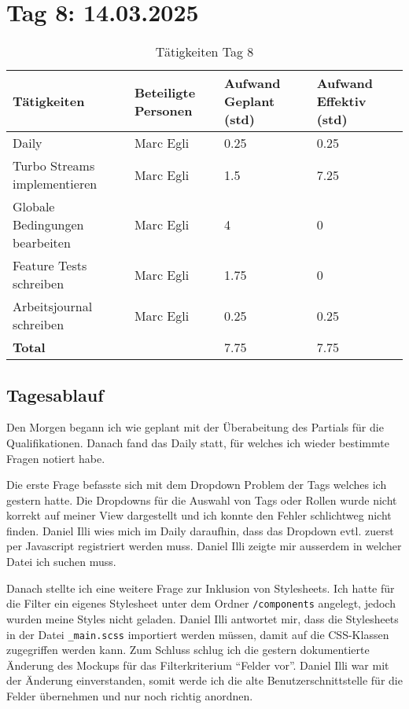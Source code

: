 \section{Tag 8: 14.03.2025}
\begin{table}[H]
    \begin{tabular}{|L{0.4\textwidth}|C{60pt}|C{60pt}|C{60pt}|}
        \hline
        \color{white}Tätigkeiten & \color{white}Beteiligte \color{white}Personen & \color{white}Aufwand Geplant (std) & \color{white}Aufwand Effektiv (std) \\
        \hline
        Daily & Marc Egli & 0.25 & 0.25 \\
        \hline
        Turbo Streams implementieren & Marc Egli & 1.5 & 7.25 \\
        \hline
        Globale Bedingungen bearbeiten & Marc Egli & 4 & 0 \\
        \hline
        Feature Tests schreiben & Marc Egli & 1.75 & 0 \\
        \hline
        Arbeitsjournal schreiben & Marc Egli & 0.25 & 0.25 \\
        \textbf{Total} &  & 7.75 & 7.75 \\
        \hline
    \end{tabular}
    \caption{Tätigkeiten Tag 8}
\end{table}

\subsection*{Tagesablauf}
Den Morgen begann ich wie geplant mit der Überabeitung des Partials für die Qualifikationen. Danach fand das Daily statt, für welches ich wieder
bestimmte Fragen notiert habe.

Die erste Frage befasste sich mit dem Dropdown Problem der Tags welches ich gestern hatte. Die Dropdowns für die Auswahl von Tags oder Rollen wurde nicht korrekt
auf meiner View dargestellt und ich konnte den Fehler schlichtweg nicht finden. Daniel Illi wies mich im Daily daraufhin, dass
das Dropdown evtl. zuerst per Javascript registriert werden muss. Daniel Illi zeigte mir ausserdem in welcher Datei ich suchen muss.

Danach stellte ich eine weitere Frage zur Inklusion von Stylesheets. Ich hatte für die Filter ein eigenes Stylesheet unter dem Ordner \texttt{/components}
angelegt, jedoch wurden meine Styles nicht geladen. Daniel Illi antwortet mir, dass die Stylesheets in der Datei \texttt{\_main.scss} importiert werden müssen,
damit auf die CSS-Klassen zugegriffen werden kann. Zum Schluss schlug ich die gestern dokumentierte Änderung des Mockups für das Filterkriterium ``Felder vor''.
Daniel Illi war mit der Änderung einverstanden, somit werde ich die alte Benutzerschnittstelle für die Felder übernehmen und nur noch richtig anordnen.

